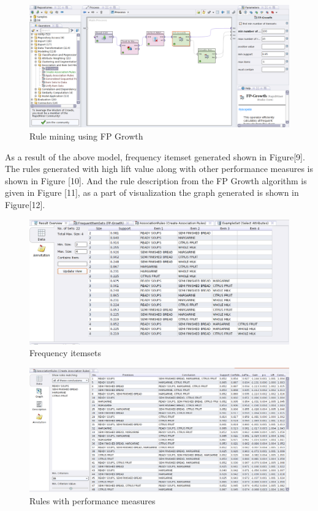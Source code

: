 \documentclass{article}\usepackage[]{graphicx}\usepackage[]{color}
\begin{document}
\begin{figure}[h]
\begin{center}
\includegraphics [scale=0.40]{fpgrowth.png}
\end{center}
\caption{Rule mining using FP Growth}
\end{figure}
As a result of the above model, frequency itemset generated shown in Figure[9]. The rules generated with high lift value along with other performance measures is shown in Figure [10]. And the rule description from the FP Growth algorithm is given in Figure [11], as a part of visualization the graph generated is shown in Figure[12].
\begin{figure}[h]
\begin{center}
\includegraphics [scale=0.40]{freq.png}
\end{center}
\caption{Frequency itemsets}
\end{figure}
\begin{figure}[h]
\begin{center}
\includegraphics [scale=0.40]{rules.png}
\end{center}
\caption{Rules with performance measures}
\end{figure}
\end{document}

